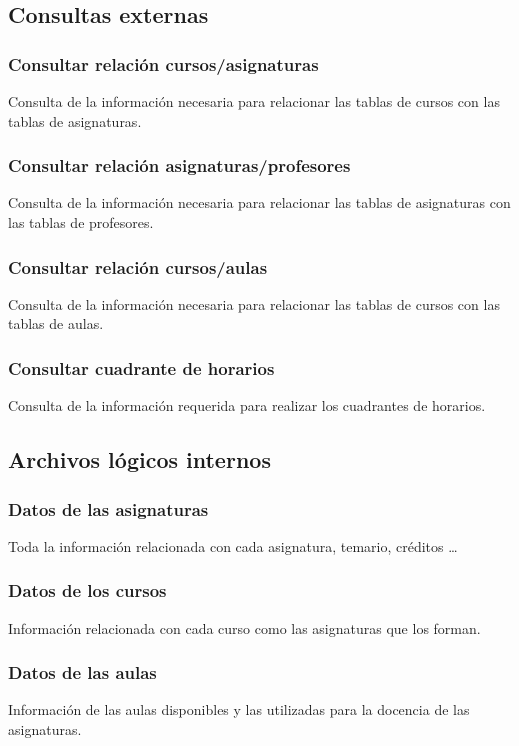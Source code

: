 \documentclass[11pt,a4paper,spanish,twoside]{book}
\begin{document}
\subsection{Consultas externas}
\subsubsection{Consultar relación cursos/asignaturas}
Consulta de la información necesaria para relacionar las tablas de
cursos con las tablas de asignaturas.

\subsubsection{Consultar relación asignaturas/profesores}
Consulta de la información necesaria para relacionar las tablas de
asignaturas con las tablas de profesores.

\subsubsection{Consultar relación cursos/aulas}
Consulta de la información necesaria para relacionar las tablas de
cursos con las tablas de aulas.

\subsubsection{Consultar cuadrante de horarios}
Consulta de la información requerida para realizar los cuadrantes de horarios.

\subsection{Archivos lógicos internos}
\subsubsection{Datos de las asignaturas}
Toda la información relacionada con cada asignatura, temario, créditos \dots

\subsubsection{Datos de los cursos}
Información relacionada con cada curso como las asignaturas que los forman.

\subsubsection{Datos de las aulas}
Información de las aulas disponibles y las utilizadas para la docencia de las
asignaturas. 
\end{document}
